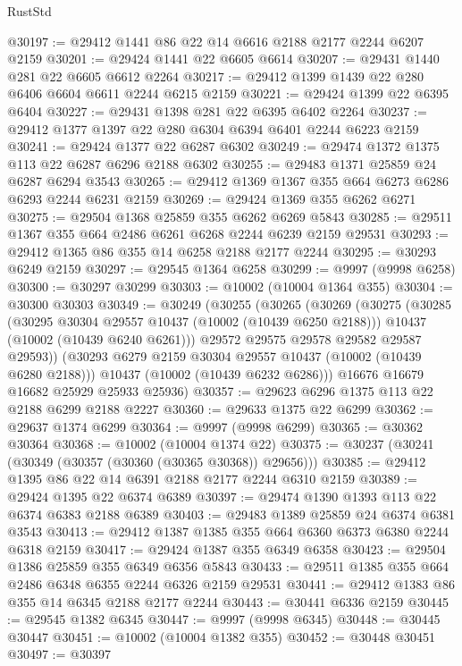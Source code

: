 \begin{lexlean}{RustStd}
\begin{coremodule}
@30197 := @29412 @1441 @86 @22 @14 @6616 @2188 @2177 @2244 @6207 @2159
@30201 := @29424 @1441 @22 @6605 @6614
@30207 := @29431 @1440 @281 @22 @6605 @6612 @2264
@30217 := @29412 @1399 @1439 @22 @280 @6406 @6604 @6611 @2244 @6215 @2159
@30221 := @29424 @1399 @22 @6395 @6404
@30227 := @29431 @1398 @281 @22 @6395 @6402 @2264
@30237 := @29412 @1377 @1397 @22 @280 @6304 @6394 @6401 @2244 @6223 @2159
@30241 := @29424 @1377 @22 @6287 @6302
@30249 := @29474 @1372 @1375 @113 @22 @6287 @6296 @2188 @6302
@30255 := @29483 @1371 @25859 @24 @6287 @6294 @3543
@30265 := @29412 @1369 @1367 @355 @664 @6273 @6286 @6293 @2244 @6231 @2159
@30269 := @29424 @1369 @355 @6262 @6271
@30275 := @29504 @1368 @25859 @355 @6262 @6269 @5843
@30285 := @29511 @1367 @355 @664 @2486 @6261 @6268 @2244 @6239 @2159 @29531
@30293 := @29412 @1365 @86 @355 @14 @6258 @2188 @2177 @2244
@30295 := @30293 @6249 @2159
@30297 := @29545 @1364 @6258
@30299 := @9997 (@9998 @6258)
@30300 := @30297 @30299
@30303 := @10002 (@10004 @1364 @355)
@30304 := @30300 @30303
@30349 := @30249
    (@30255
      (@30265
        (@30269
          (@30275
            (@30285
              (@30295 @30304 @29557 @10437 (@10002 (@10439 @6250 @2188)))
              @10437
              (@10002 (@10439 @6240 @6261)))
            @29572
            @29575
            @29578
            @29582
            @29587
            @29593))
        (@30293 @6279 @2159 @30304 @29557 @10437 (@10002 (@10439 @6280 @2188)))
        @10437
        (@10002 (@10439 @6232 @6286)))
      @16676
      @16679
      @16682
      @25929
      @25933
      @25936)
@30357 := @29623 @6296 @1375 @113 @22 @2188 @6299 @2188 @2227
@30360 := @29633 @1375 @22 @6299
@30362 := @29637 @1374 @6299
@30364 := @9997 (@9998 @6299)
@30365 := @30362 @30364
@30368 := @10002 (@10004 @1374 @22)
@30375 := @30237 (@30241 (@30349 (@30357 (@30360 (@30365 @30368)) @29656)))
@30385 := @29412 @1395 @86 @22 @14 @6391 @2188 @2177 @2244 @6310 @2159
@30389 := @29424 @1395 @22 @6374 @6389
@30397 := @29474 @1390 @1393 @113 @22 @6374 @6383 @2188 @6389
@30403 := @29483 @1389 @25859 @24 @6374 @6381 @3543
@30413 := @29412 @1387 @1385 @355 @664 @6360 @6373 @6380 @2244 @6318 @2159
@30417 := @29424 @1387 @355 @6349 @6358
@30423 := @29504 @1386 @25859 @355 @6349 @6356 @5843
@30433 := @29511 @1385 @355 @664 @2486 @6348 @6355 @2244 @6326 @2159 @29531
@30441 := @29412 @1383 @86 @355 @14 @6345 @2188 @2177 @2244
@30443 := @30441 @6336 @2159
@30445 := @29545 @1382 @6345
@30447 := @9997 (@9998 @6345)
@30448 := @30445 @30447
@30451 := @10002 (@10004 @1382 @355)
@30452 := @30448 @30451
@30497 := @30397

\end{coremodule}
\end{lexlean}
